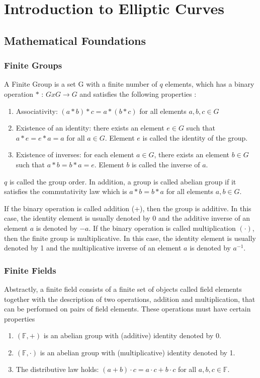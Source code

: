\chapter{Introduction to Elliptic Curves}
\section{Mathematical Foundations}
\subsection{Finite Groups}
A Finite Group is a set G with a finite number of $q$ elements, which has a binary operation $*$ : $G x G \rightarrow G$ and satisfies the following properties \cite{hankerson2006guide}:
\begin{enumerate}
	\item Associativity: $(a*b)*c=a*(b*c)$ for all elements $a,b,c \in G$
	\item Existence of an identity: there exists an element $e \in G$ such that $a*e=e*a=a$ for all $a \in G$. Element $e$ is called the identity of the group.
	\item Existence of inverses: for each element $a \in G$, there exists an element $b \in G$ such that $a*b=b*a=e$. Element $b$ is called the inverse of $a$.
\end{enumerate}
$q$ is called the group order. In addition, a group is called abelian group if it satisfies the commutativity law which is $a*b=b*a$ for all elements $a,b \in G$. 

If the binary operation is called addition (+), then the group is additive. In this case, the identity element is usually denoted by 0 and the additive inverse of an element $a$ is denoted by $-a$. If the binary operation is called multiplication $(\cdot)$, then the finite group is multiplicative. In this case, the identity element is usually denoted by 1 and the multiplicative inverse of an element $a$ is denoted by $a^{-1}$.

\subsection{Finite Fields}
Abstractly, a finite field consists of a finite set of objects called field elements together with the description of two operations, addition and multiplication, that can be performed on pairs of field elements. These operations must have certain properties \cite{hankerson2006guide}
\begin{enumerate}
	\item $(\mathbb{F},+)$ is an abelian group with (additive) identity denoted by 0.
	\item $(\mathbb{F},\cdot)$ is an abelian group with (multiplicative) identity denoted by 1.
	\item The distributive law holds: $(a+b) \cdot c = a \cdot c + b \cdot c$ for all $a,b,c \in \mathbb{F}$. 
\end{enumerate}

